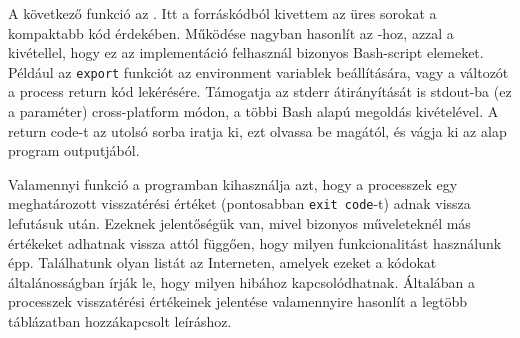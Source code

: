 A következő funkció az \texttt{}. Itt a forráskódból kivettem az üres sorokat a kompaktabb kód érdekében. Működése nagyban hasonlít az \texttt{}-hoz, azzal a kivétellel, hogy ez az implementáció felhasznál bizonyos Bash-script elemeket. Például az \texttt{export} funkciót az environment variablek beállítására, vagy a \texttt{} változót a process return kód lekérésére. Támogatja az stderr átirányítását is stdout-ba (ez a \texttt{} paraméter) cross-platform módon, a többi Bash alapú megoldás kivételével. A return code-t az utolsó sorba iratja ki, ezt olvassa be magától, és vágja ki az alap program outputjából.

\pagebreak
{}
Valamennyi funkció a programban kihasználja azt, hogy a processzek egy meghatározott visszatérési értéket (pontosabban \texttt{exit code}-t) adnak vissza lefutásuk után. Ezeknek jelentőségük van, mivel bizonyos műveleteknél más értékeket adhatnak vissza attól függően, hogy milyen funkcionalitást használunk épp. Találhatunk olyan listát az Interneten, amelyek ezeket a kódokat általánosságban írják le, hogy milyen hibához kapcsolódhatnak. 
Általában a processzek visszatérési értékeinek jelentése valamennyire hasonlít a legtöbb táblázatban hozzákapcsolt leíráshoz. \cite{linux_exitcodes}

